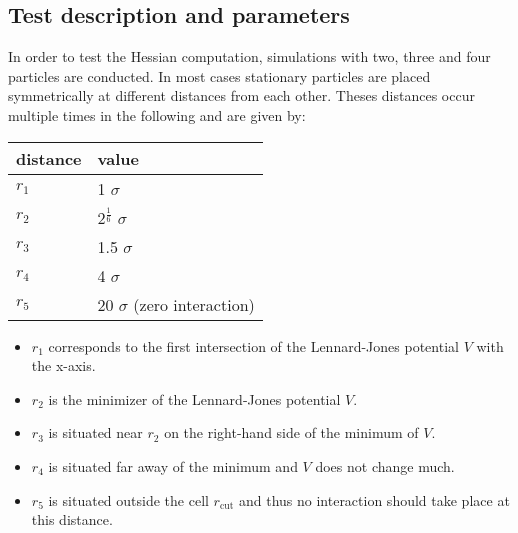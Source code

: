 \documentclass[a4paper]{article}
\begin{document}
\subsection{Test description and parameters}
\label{sec-1-2}
In order to test the Hessian computation, simulations with two, three and four particles are conducted.
In most cases stationary particles are placed symmetrically at different distances from each other.
Theses distances occur multiple times in the following and are given by:
\begin{center}
\begin{tabular}{ll}
distance & value\\
\hline
\(r_1\) & 1 $\sigma$\\
\(r_2\) & 2$^{\frac{1}{6}}$ $\sigma$\\
\(r_3\) & 1.5 $\sigma$\\
\(r_4\) & 4 $\sigma$\\
\(r_5\) & 20 $\sigma$ (zero interaction)\\
\end{tabular}
\end{center}
\begin{itemize}
\item \(r_1\) corresponds to the first intersection of the Lennard-Jones potential \(V\) with the x-axis.
\item \(r_2\) is the minimizer of the Lennard-Jones potential \(V\).
\item \(r_3\) is situated near \(r_2\) on the right-hand side of the minimum of \(V\).
\item \(r_4\) is situated far away of the minimum and \(V\) does not change much.
\item \(r_5\) is situated outside the cell \(r_{\textrm{cut}}\) and thus no interaction should take place at this distance.
\end{itemize}
\end{document}
